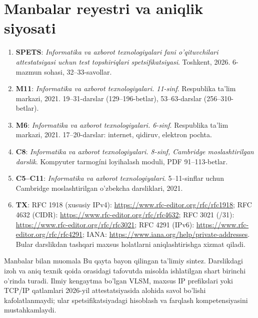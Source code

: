 \documentclass[11pt,a4paper,oneside]{book}
\begin{document}
\chapter{Manbalar reyestri va aniqlik siyosati}
\begin{enumerate}
\item \textbf{SPETS}: \textit{Informatika va axborot texnologiyalari fani o'qituvchilari attestatsiyasi uchun test topshiriqlari spetsifikatsiyasi}. Toshkent, 2026. 6-mazmun sohasi, 32--33-savollar.
\item \textbf{M11}: \textit{Informatika va axborot texnologiyalari. 11-sinf}. Respublika ta'lim markazi, 2021. 19--31-darslar (129--196-betlar), 53--63-darslar (256--310-betlar).
\item \textbf{M6}: \textit{Informatika va axborot texnologiyalari. 6-sinf}. Respublika ta'lim markazi, 2021. 17--20-darslar: internet, qidiruv, elektron pochta.
\item \textbf{C8}: \textit{Informatika va axborot texnologiyalari. 8-sinf, Cambridge moslashtirilgan darslik}. Kompyuter tarmog\'ini loyihalash moduli, PDF 91--113-betlar.
\item \textbf{C5--C11}: \textit{Informatika va axborot texnologiyalari}. 5--11-sinflar uchun Cambridge moslashtirilgan o'zbekcha darsliklari, 2021.
\item \textbf{TX}: RFC 1918 (xususiy IPv4): \url{https://www.rfc-editor.org/rfc/rfc1918}; RFC 4632 (CIDR): \url{https://www.rfc-editor.org/rfc/rfc4632}; RFC 3021 (/31): \url{https://www.rfc-editor.org/rfc/rfc3021}; RFC 4291 (IPv6): \url{https://www.rfc-editor.org/rfc/rfc4291}; IANA: \url{https://www.iana.org/help/private-addresses}. Bular darslikdan tashqari maxsus holatlarni aniqlashtirishga xizmat qiladi.
\end{enumerate}
\begin{caution}{Manbalar bilan muomala}
Bu qayta bayon qilingan ta'limiy sintez. Darslikdagi izoh va aniq texnik qoida orasidagi tafovutda misolda ishlatilgan shart birinchi o'rinda turadi. Ilmiy kengaytma bo'lgan VLSM, maxsus IP prefikslari yoki TCP/IP qatlamlari 2026-yil attestatsiyasida alohida savol bo'lishi kafolatlanmaydi; ular spetsifikatsiyadagi hisoblash va farqlash kompetensiyasini mustahkamlaydi.
\end{caution}
\end{document}
